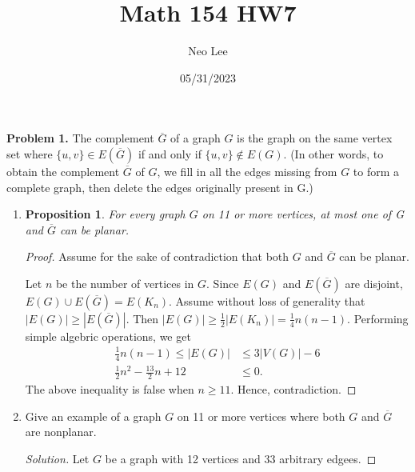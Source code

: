 \documentclass{article}
\title{Math 154 HW7}
\author{Neo Lee}
\date{05/31/2023}
\newtheorem{prop}[thm]{Proposition}
\begin{document}
 

\maketitle 

\textbf{Problem 1.}
The complement $\overline{G}$ of a graph $G$ is the graph on the same vertex set where $\{u,v\}\in E(\overline{G})$ if and only if $\{u,v\}\not\in E(G)$. 
(In other words, to obtain the complement $\overline{G}$ of $G$, we fill in all the edges missing from $G$ to form a complete graph, then delete the edges originally present in G.)
\begin{enumerate}[label=(\alph*)]
    \item 
    \begin{prop}
        For every graph $G$ on 11 or more vertices, at most one of G and $\overline{G}$ can be planar.
    \end{prop}
    \begin{proof}
        Assume for the sake of contradiction that both $G$ and $\overline{G}$ can be planar.
    
        Let $n$ be the number of vertices in $G$.
        Since $E(G)$ and $E(\overline{G})$ are disjoint, $E(G) \cup E(\overline{G}) = E(K_n)$.
        Assume without loss of generality that $|E(G)| \ge |E(\overline{G})|$.
        Then $|E(G)| \ge \frac{1}{2} |E(K_n)| = \frac{1}{4} n(n-1)$.
        Performing simple algebric operations, we get
        \begin{align*}
            \frac{1}{4} n(n-1) \le |E(G)| & \le 3|V(G)| - 6 \\
            \frac{1}{2} n^2 - \frac{13}{2} n + 12 & \le 0.
        \end{align*}
        The above inequality is false when $n \ge 11$. Hence, contradiction.
    \end{proof}

    \item 
    Give an example of a graph $G$ on 11 or more vertices where both $G$ and $\overline{G}$ are nonplanar.
    \begin{proof}[Solution]
        Let $G$ be a graph with 12 vertices and 33 arbitrary edgees.
    \end{proof}
\end{enumerate}
\bigbreak
\end{document}
